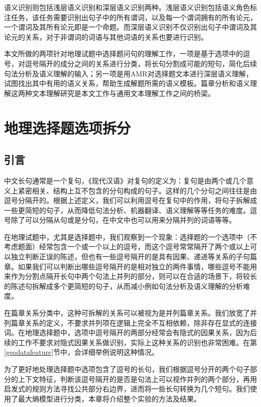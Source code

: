 \documentclass[master, winfont]{njuthesis}
\begin{document}
语义识别则包括浅层语义识别和深层语义识别两种。浅层语义识别包括语义角色标注任务，该任务需要识别出句子中的所有谓词，以及每一个谓词拥有的所有论元，一个谓词及其所有论元即是一个命题。而深层语义识别不仅识别出句子中谓词及其论元的关系，对于非谓词的词语与其他词语的关系也要进行识别。

本文所做的两项针对地理试题中选择题问句的理解工作，一项是基于选项中的逗号，对逗号隔开的成分之间的关系进行分类，将长句分割成可能的短句，简化后续句法分析及语义理解的输入；另一项是用AMR对选择题文本进行深层语义理解，试图找出其中有用的语义关系，帮助生成解题所需的语义模板。篇章分析和语义理解这两种文本理解研究是本文工作与通用文本理解工作之间的桥梁。

\chapter{地理选择题选项拆分}
\label{chapter:split}
\section{引言}
中文长句通常是一个复句，《现代汉语》对复句的定义为：复句是由两个或几个意义上紧密相关、结构上互不包含的分句构成的句子\cite{zhou2008}。这样的几个分句之间往往是由逗号分隔开的。根据上述定义，我们可以利用逗号在复句中的作用，将句子拆解成一些更简短的句子，从而降低句法分析、机器翻译、语义理解等等任务的难度。逗号除了可以分隔从句或是分句，在中文中也可以用来分隔并列的词语等等。

在地理试题中，尤其是选择题中，我们观察到一个现象：选择题的一个选项中（不考虑题面）经常包含一个或一个以上的逗号，而这个逗号常常隔开了两个或以上可以独立判断正误的陈述，但也有一些逗号隔开的是具有因果、递进等关系的子句篇章。如果我们可以判断出哪些逗号隔开的是相对独立的两件事情，哪些逗号不能用来作为分割点隔开长句中两个句法上并列的部分，则可以在合适的场景下，将较长的陈述句拆解成多个更简短的句子，从而减小例如句法分析及语义理解的分析难度。

在篇章关系分类中，这种可拆解的关系可以被视为是并列篇章关系。我们放宽了并列篇章关系的定义，不要求并列项在逻辑上完全不互相依赖，除非存在显式的连接词。在地理选择题中，选项中逗号隔开的两部分经常会有隐式的因果关系，因为后续的工作不要求对隐式因果关系做识别，实际上这种关系的识别也非常困难。在第\ref{geodatafeature}节中，会详细举例说明这种情况。

为了更好地处理选择题中选项包含了逗号的长句，我们根据逗号分开的两个句子部分的上下文特征，判断该逗号隔开的是否是句法上可以视作并列的两个部分，再用启发式的规则方法寻找公共部分右边界，进而将一些长句转换为几个短句。我们使用了最大熵模型进行分类，本章将介绍整个实验的方法及结果。
\end{document}
